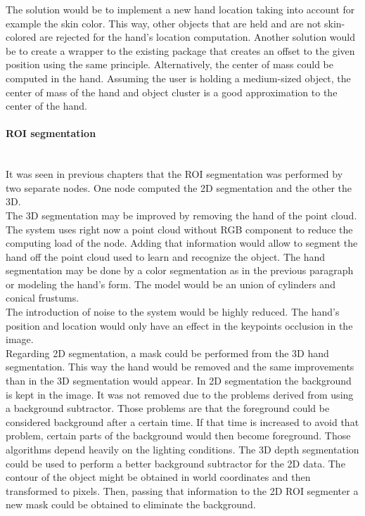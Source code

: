 	The solution would be to implement a new hand location taking into account for example the skin color. 
	This way, other objects that are held and are not skin-colored are rejected for the hand's location computation. 
	Another solution would be to create a wrapper to the existing package that creates an offset to the given position using the same principle. 
	Alternatively, the center of mass could be computed in the hand. 
	Assuming the user is holding a medium-sized object, the center of mass of the hand and object cluster is a good approximation to the center of the hand. 
	\\
	
	\paragraph{ROI segmentation}\mbox{}\\

	It was seen in previous chapters that the ROI segmentation was performed by two separate nodes. 
	One node computed the 2D segmentation and the other the 3D. 
	\\

	The 3D segmentation may be improved by removing the hand of the point cloud. 
	The system uses right now a point cloud without RGB component to reduce the computing load of the node. 
	Adding that information would allow to segment the hand off the point cloud used to learn and recognize the object. 
	The hand segmentation may be done by a color segmentation as in the previous paragraph or modeling the hand's form. 
	The model would be an union of cylinders and conical frustums.
	\\

	The introduction of noise to the system would be highly reduced.
	The hand's position and location would only have an effect in the keypoints occlusion in the image. 
	\\

	Regarding 2D segmentation, a mask could be performed from the 3D hand segmentation. 
	This way the hand would be removed and the same improvements than in the 3D segmentation would appear. 
	In 2D segmentation the background is kept in the image. 
	It was not removed due to the problems derived from using a background subtractor. 
	Those problems are that the foreground could be considered background after a certain time. 
	If that time is increased to avoid that problem, certain parts of the background would then become foreground. 
	Those algorithms depend heavily on the lighting conditions. 
	The 3D depth segmentation could be used to perform a better background subtractor for the 2D data. 
	The contour of the object might be obtained in world coordinates and then transformed to pixels. 
	Then, passing that information to the 2D ROI segmenter a new mask could be obtained to eliminate the background. 
	\\




